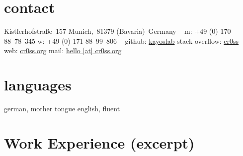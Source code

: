 \documentclass[]{friggeri-cv} %
\begin{document}


\begin{aside} %
	\section{contact}
	Kistlerhofstraße~157
	Munich,~81379 
	(Bavaria)~Germany
	~
	m: +49 (0) 170 88~78~345
	w: +49 (0) 171 88~99~806‬
	~
	github: \href{https://github.com/kayoslab}{kayoslab}
	stack overflow: \href{https://stackoverflow.com/story/cr0ss}{cr0ss}
	web: \href{https://cr0ss.org/}{cr0ss.org}
	mail: \href{mailto:hello@cr0ss.org}{hello [at] cr0ss.org}
	~
	\section{languages}
	german, mother tongue
	english, fluent
\end{aside}


\section{Work Experience (excerpt)}

	
\end{document}
